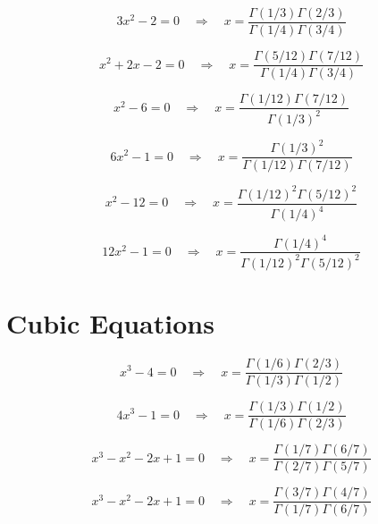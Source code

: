 \documentclass[11pt,a4paper]{article}
\begin{document}
\begin{equation}\label{eq:28}
3x^{2} - 2 = 0 \quad \Rightarrow \quad x = \frac{\Gamma(1/3)\Gamma(2/3)}{\Gamma(1/4)\Gamma(3/4)}
\end{equation}

\begin{equation}\label{eq:29}
x^{2} + 2x - 2 = 0 \quad \Rightarrow \quad x = \frac{\Gamma(5/12)\Gamma(7/12)}{\Gamma(1/4)\Gamma(3/4)}
\end{equation}

\begin{equation}\label{eq:30}
x^{2} - 6 = 0 \quad \Rightarrow \quad x = \frac{\Gamma(1/12)\Gamma(7/12)}{\Gamma(1/3)^2}
\end{equation}

\begin{equation}\label{eq:31}
6x^{2} - 1 = 0 \quad \Rightarrow \quad x = \frac{\Gamma(1/3)^2}{\Gamma(1/12)\Gamma(7/12)}
\end{equation}

\begin{equation}\label{eq:32}
x^{2} - 12 = 0 \quad \Rightarrow \quad x = \frac{\Gamma(1/12)^2\Gamma(5/12)^2}{\Gamma(1/4)^4}
\end{equation}

\begin{equation}\label{eq:33}
12x^{2} - 1 = 0 \quad \Rightarrow \quad x = \frac{\Gamma(1/4)^4}{\Gamma(1/12)^2\Gamma(5/12)^2}
\end{equation}

\section{Cubic Equations}

\begin{equation}\label{eq:34}
x^{3} - 4 = 0 \quad \Rightarrow \quad x = \frac{\Gamma(1/6)\Gamma(2/3)}{\Gamma(1/3)\Gamma(1/2)}
\end{equation}

\begin{equation}\label{eq:35}
4x^{3} - 1 = 0 \quad \Rightarrow \quad x = \frac{\Gamma(1/3)\Gamma(1/2)}{\Gamma(1/6)\Gamma(2/3)}
\end{equation}

\begin{equation}\label{eq:36}
x^{3} - x^{2} - 2x + 1 = 0 \quad \Rightarrow \quad x = \frac{\Gamma(1/7)\Gamma(6/7)}{\Gamma(2/7)\Gamma(5/7)}
\end{equation}

\begin{equation}\label{eq:37}
x^{3} - x^{2} - 2x + 1 = 0 \quad \Rightarrow \quad x = \frac{\Gamma(3/7)\Gamma(4/7)}{\Gamma(1/7)\Gamma(6/7)}
\end{equation}
\end{document}
